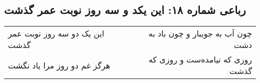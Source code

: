 \begin{center}
\section*{رباعی شماره ۱۸: این یکد و سه روز نوبت عمر گذشت}
\label{sec:sh018}
\begin{longtable}{l p{0.5cm} r}
این یک دو سه روز نوبت عمر گذشت
&&
چون آب به جویبار و چون باد به دشت
\\
هرگز غم دو روز مرا یاد نگشت
&&
روزی که نیامده‌ست و روزی که گذشت
\\
\end{longtable}
\end{center}
